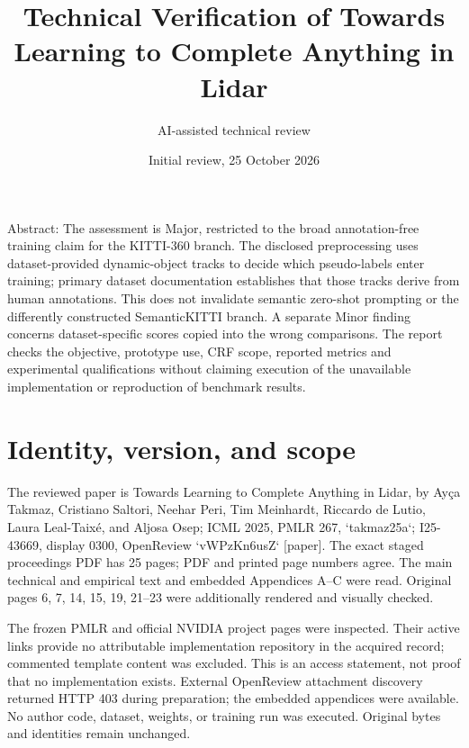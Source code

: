 \documentclass[10pt]{article}
\title{Technical Verification of
Towards Learning to Complete Anything in Lidar}
\author{AI-assisted technical review}
\date{Initial review, 25 October 2026}
\begin{document}
\maketitle
Abstract: The assessment is Major, restricted to the broad annotation-free training claim for the KITTI-360 branch. The disclosed preprocessing uses dataset-provided dynamic-object tracks to decide which pseudo-labels enter training; primary dataset documentation establishes that those tracks derive from human annotations. This does not invalidate semantic zero-shot prompting or the differently constructed SemanticKITTI branch. A separate Minor finding concerns dataset-specific scores copied into the wrong comparisons. The report checks the objective, prototype use, CRF scope, reported metrics and experimental qualifications without claiming execution of the unavailable implementation or reproduction of benchmark results.\par
\section*{Identity, version, and scope}
The reviewed paper is Towards Learning to Complete Anything in Lidar, by Ayça Takmaz, Cristiano Saltori, Neehar Peri, Tim Meinhardt, Riccardo de Lutio, Laura Leal-Taixé, and Aljosa Osep; ICML 2025, PMLR 267, `takmaz25a`; I25-43669, display 0300, OpenReview `vWPzKn6usZ` [paper]. The exact staged proceedings PDF has 25 pages; PDF and printed page numbers agree. The main technical and empirical text and embedded Appendices A–C were read. Original pages 6, 7, 14, 15, 19, 21–23 were additionally rendered and visually checked.\par
The frozen PMLR and official NVIDIA project pages were inspected. Their active links provide no attributable implementation repository in the acquired record; commented template content was excluded. This is an access statement, not proof that no implementation exists. External OpenReview attachment discovery returned HTTP 403 during preparation; the embedded appendices were available. No author code, dataset, weights, or training run was executed. Original bytes and identities remain unchanged.\par
\end{document}

